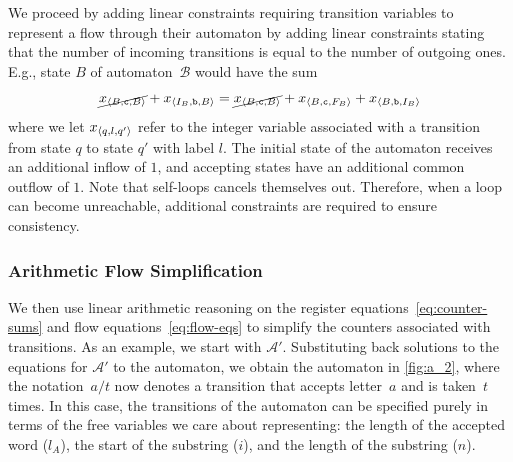 We proceed by adding linear constraints requiring transition variables to
represent a flow through their automaton by adding linear constraints stating
that the number of incoming transitions is equal to the number of outgoing ones.
E.g., state $B$ of automaton~$\mathcal{B}$ would have the sum
%
\begin{equation}\label{eq:flow-eqs}
  \cancel{x_{\left\langle B, \texttt{c}, B\right\rangle}} +
  x_{\left\langle I_B, \texttt{b}, B\right\rangle} = \cancel{x_{\left\langle B, \texttt{c}, B\right\rangle}}  +
  x_{\left\langle B, \texttt{c}, F_B\right\rangle} + x_{\left\langle B, \texttt{b}, I_B\right\rangle}
\end{equation}
%
where we let
$x_{\left\langle q, l, q'\right\rangle}$ refer to the integer variable associated with a
transition from state $q$ to state $q'$ with label $l$. The initial state
of the automaton receives an additional inflow of $1$, and accepting
states have an additional common outflow of $1$. Note that self-loops
cancels themselves out. Therefore, when a loop can become
unreachable, additional constraints are required to ensure consistency.


\subsubsection{Arithmetic Flow Simplification}\label{sec:intuition:algebra}

We then use linear arithmetic reasoning on the register
equations~\eqref{eq:counter-sums} and flow
equations~\eqref{eq:flow-eqs} to simplify the counters associated
with transitions.
As an example, we start with $\mathcal{A}'$. Substituting back
solutions to the equations for $\mathcal{A}'$ to the automaton, we obtain the
automaton in \cref{fig:a_2}, where the notation~$a / t$ now denotes
a transition that accepts letter~$a$ and is taken~$t$ times.
In this case, the transitions of the automaton
can be specified purely in terms of the free
variables we care about representing:  the length of the accepted word ($l_A$), the
start of the substring ($i$), and the length of the substring ($n$).

